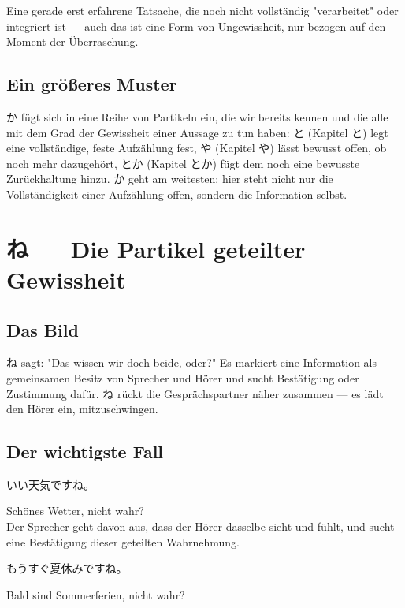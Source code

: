 \documentclass[12pt]{book}
\begin{document}
Eine gerade erst erfahrene Tatsache, die noch nicht vollständig "verarbeitet" oder integriert ist — auch das ist eine Form von Ungewissheit, nur bezogen auf den Moment der Überraschung.

\section*{Ein größeres Muster}

か fügt sich in eine Reihe von Partikeln ein, die wir bereits kennen und die alle mit dem Grad der Gewissheit einer Aussage zu tun haben: と (Kapitel と) legt eine vollständige, feste Aufzählung fest, や (Kapitel や) lässt bewusst offen, ob noch mehr dazugehört, とか (Kapitel とか) fügt dem noch eine bewusste Zurückhaltung hinzu. か geht am weitesten: hier steht nicht nur die Vollständigkeit einer Aufzählung offen, sondern die Information selbst.


\chapter{ね — Die Partikel geteilter Gewissheit}

\section*{Das Bild}

ね sagt: "Das wissen wir doch beide, oder?" Es markiert eine Information als gemeinsamen Besitz von Sprecher und Hörer und sucht Bestätigung oder Zustimmung dafür. ね rückt die Gesprächspartner näher zusammen — es lädt den Hörer ein, mitzuschwingen.

\section*{Der wichtigste Fall}

\par\quad いい天気ですね。\\
\par\quad Schönes Wetter, nicht wahr?\\

Der Sprecher geht davon aus, dass der Hörer dasselbe sieht und fühlt, und sucht eine Bestätigung dieser geteilten Wahrnehmung.

\par\quad もうすぐ夏休みですね。\\
\par\quad Bald sind Sommerferien, nicht wahr?\\
\end{document}
